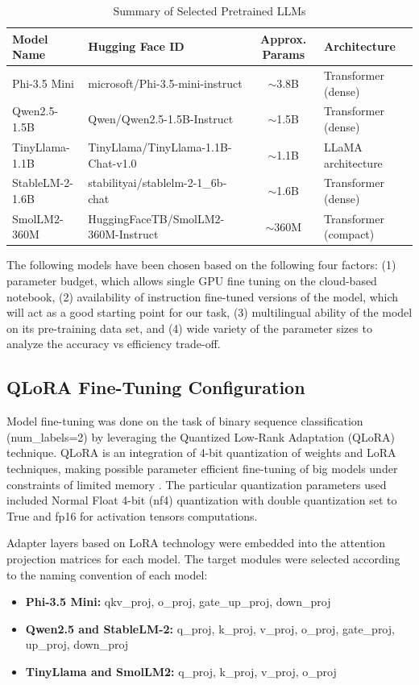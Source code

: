 \documentclass[journal]{IEEEtran}
\begin{document}
\begin{table}[htbp]
\caption{Summary of Selected Pretrained LLMs}
\label{tab:models}
\begin{center}
\begin{tabular}{llcl}
\toprule
\textbf{Model Name} & \textbf{Hugging Face ID} & \textbf{Approx. Params} & \textbf{Architecture} \\
\midrule
Phi-3.5 Mini & microsoft/Phi-3.5-mini-instruct & $\sim$3.8B & Transformer (dense) \\
Qwen2.5-1.5B & Qwen/Qwen2.5-1.5B-Instruct & $\sim$1.5B & Transformer (dense) \\
TinyLlama-1.1B & TinyLlama/TinyLlama-1.1B-Chat-v1.0 & $\sim$1.1B & LLaMA architecture \\
StableLM-2-1.6B & stabilityai/stablelm-2-1\_6b-chat & $\sim$1.6B & Transformer (dense) \\
SmolLM2-360M & HuggingFaceTB/SmolLM2-360M-Instruct & $\sim$360M & Transformer (compact) \\
\bottomrule
\end{tabular}
\end{center}
\end{table}

The following models have been chosen based on the following four factors: (1) parameter budget, which allows single GPU fine tuning on the cloud-based notebook, (2) availability of instruction fine-tuned versions of the model, which will act as a good starting point for our task, (3) multilingual ability of the model on its pre-training data set, and (4) wide variety of the parameter sizes to analyze the accuracy vs efficiency trade-off.

\subsection{QLoRA Fine-Tuning Configuration}

Model fine-tuning was done on the task of binary sequence classification
(num\_labels=2) by leveraging the Quantized Low-Rank Adaptation (QLoRA)
technique. QLoRA is an integration of 4-bit quantization of weights and
LoRA techniques, making possible parameter efficient fine-tuning of big
models under constraints of limited memory \cite{ref11}. The
particular quantization parameters used included Normal Float 4-bit
(nf4) quantization with double quantization set to True and fp16 for
activation tensors computations.

Adapter layers based on LoRA technology were embedded into the attention
projection matrices for each model. The target modules were selected
according to the naming convention of each model:
\begin{itemize}
    \item \textbf{Phi-3.5 Mini:} qkv\_proj, o\_proj, gate\_up\_proj, down\_proj
    \item \textbf{Qwen2.5 and StableLM-2:} q\_proj, k\_proj, v\_proj, o\_proj, gate\_proj, up\_proj, down\_proj
    \item \textbf{TinyLlama and SmolLM2:} q\_proj, k\_proj, v\_proj, o\_proj
\end{itemize}
\end{document}
